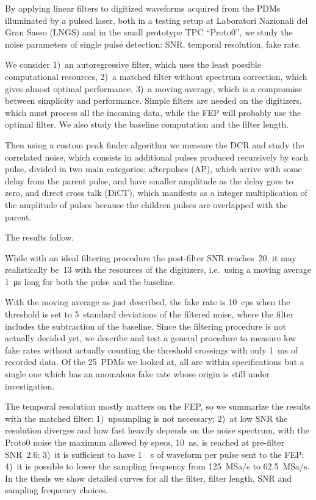\documentclass[11pt]{article}
\begin{document}
    By applying linear filters to digitized waveforms acquired from the PDMs
    illuminated by a pulsed laser, both in a testing setup at Laboratori
    Nazionali del Gran Sasso (LNGS) and in the small prototype TPC ``Proto0'',
    we study the noise parameters of single pulse detection: SNR, temporal
    resolution, fake rate.
    
    We consider 1)~an autoregressive filter, which uses the least possible
    computational resources, 2)~a matched filter without spectrum correction,
    which gives almost optimal performance, 3)~a moving average, which is a
    compromise between simplicity and performance. Simple filters are needed on
    the digitizers, which must process all the incoming data, while the FEP
    will probably use the optimal filter. We also study the baseline
    computation and the filter length.
    
    Then using a custom peak finder algorithm we measure the DCR and study the
    correlated noise, which consists in additional pulses produced recursively
    by each pulse, divided in two main categories: afterpulses (AP), which
    arrive with some delay from the parent pulse, and have smaller amplitude as
    the delay goes to zero, and direct cross talk (DiCT), which manifests as a
    integer multiplication of the amplitude of pulses because the children
    pulses are overlapped with the parent.
    
    The results follow.
    
    While with an ideal filtering procedure the post-filter SNR reaches~20, it
    may realistically be~13 with the resources of the digitizers, i.e.\ using a
    moving average \SI{1}{\micro s} long for both the pulse and the baseline.
    
    With the moving average as just described, the fake rate is \SI{10}{cps}
    when the threshold is set to 5~standard deviations of the filtered noise,
    where the filter includes the subtraction of the baseline. Since the
    filtering procedure is not actually decided yet, we describe and test a
    general procedure to measure low fake rates without actually counting the
    threshold crossings with only \SI{1}{ms} of recorded data. Of the 25~PDMs
    we looked at, all are within specifications but a single one which has an
    anomalous fake rate whose origin is still under investigation.

    The temporal resolution mostly matters on the FEP, so we summarize the
    results with the matched filter: 1)~upsampling is not necessary; 2)~at low
    SNR the resolution diverges and how fast heavily depends on the noise
    spectrum, with the Proto0 noise the maximum allowed by specs, \SI{10}{ns},
    is reached at pre-filter SNR~2.6; 3)~it is sufficient to have \SI{1}{\micro
    s} of waveform per pulse sent to the FEP; 4)~it is possible to lower the
    sampling frequency from \SI{125}{MSa/s} to \SI{62.5}{MSa/s}. In the thesis
    we show detailed curves for all the filter, filter length, SNR and sampling
    frequency choices.
    
\end{document}
